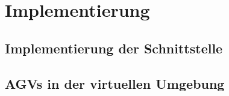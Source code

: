 \chapter{Implementierung}
\section{Implementierung der Schnittstelle}
\section{AGVs in der virtuellen Umgebung}
